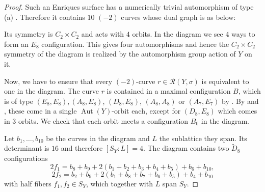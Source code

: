 \documentclass[a4paper]{amsart}
\theoremstyle{definition}
\theoremstyle{plain}
\DeclareMathOperator{\Aut}{Aut}
\newcommand{\R}{\mathcal{R}}
\begin{document}
\begin{proof}
Such an Enriques surface has a numerically trivial automorphism of type (a)
\cite[Theorem 8.2.21, Remark 8.2.22]{enriquesII}. Therefore it contains $10$ $(-2)$ curves whose dual graph is as below:

\begin{center}

\end{center}
Its symmetry is $C_2 \times C_2$ and acts with $4$ orbits. In the diagram we see $4$ ways to form an $E_8$ configuration. This gives four automorphisms and hence the $C_2 \times C_2$ symmetry of the diagram is realized by the automorphism group action of $Y$ on it. 

Now, we have to ensure that every $(-2)$-curve $r \in \R(Y,\sigma)$ is equivalent to one in the diagram.
The curve $r$ is contained in a maximal configuration $B$, which is of type $(E_8,E_8),(A_8,E_8)$, $(D_8,E_8)$, $(A_8,A_8)$ or $(A_7,E_7)$ by .
By  and , these come in 
a single $\Aut(Y)$-orbit each, except for $(D_8,E_8)$ which comes in $3$ orbits. 
We check that each orbit meets a configuration $B_0$ in the diagram.

Let $b_1,\dots, b_{10}$ be the curves in the diagram and $L$ the sublattice they span. Its determinant is $16$ and therefore $[S_Y:L]=4$.
The diagram contains two $\widetilde{D}_8$ configurations
\[2f_1 = b_8+b_9+2(b_1+b_2+b_3+b_4+b_5)+b_6+b_{10},\]
\[2f_2 = b_2+b_9+2(b_1+b_8+b_7+b_6+b_5)+b_4+b_{10}\]
with half fibers $f_1,f_2 \in S_Y$, which together with $L$ span $S_Y$.


\end{proof}
\end{document}
